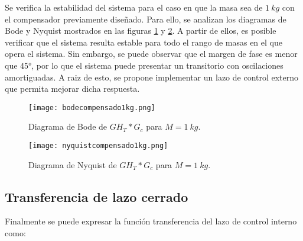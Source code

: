 
\noindent Se verifica la estabilidad del sistema  para el caso en que la masa sea de $1\:kg$ con el compensador previamente diseñado. Para ello, se analizan los diagramas de Bode y Nyquist mostrados en las figuras \ref{fig:bode-analog-para-M-1Kg} y \ref{fig:nyquist-analog-para-M-1Kg}. A partir de ellos, es posible verificar que el sistema resulta estable para todo el rango de masas en el que opera el sistema. Sin embargo, se puede observar que el margen de fase es menor que 45°, por lo que el sistema puede presentar un transitorio con oscilaciones amortiguadas. A raiz de esto, se propone implementar un lazo de control externo que permita mejorar dicha respuesta.

\begin{figure}[H]
	\centering
	\texttt{[image: bodecompensado1kg.png]}
	\caption{Diagrama de Bode de $GH_T*G_c$ para $M=1\:kg$.}
	\label{fig:bode-analog-para-M-1Kg}
\end{figure}


\begin{figure}[H]
	\centering
	\texttt{[image: nyquistcompensado1kg.png]}
	\caption{Diagrama de Nyquist de $GH_T*G_c$ para $M=1\:kg$.}
	\label{fig:nyquist-analog-para-M-1Kg}
\end{figure}


\subsection{Transferencia de lazo cerrado}


Finalmente se puede expresar la función transferencia del lazo de control interno como:
%


